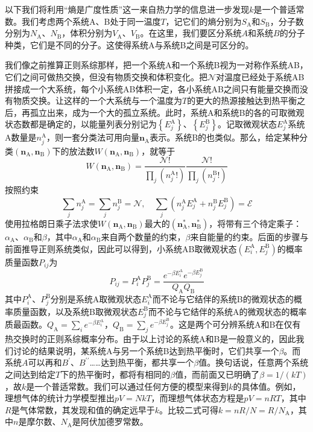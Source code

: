 \documentclass[main.tex]{subfiles}
\begin{document}
以下我们将利用“熵是广度性质”这一来自热力学的信息进一步发现$k$是一个普适常数。我们考虑两个系统A、B处于同一温度$T$，记它们的熵分别为$S_\text{A}$和$S_\text{B}$，分子数分别为$N_\text{A}$、$N_\text{B}$，体积分别为$V_\text{A}$、$V_\text{B}$。在这里，我们要区分系统$A$和系统$B$的分子种类，它们是不同的分子。这使得系统A与系统B之间是可区分的。

我们像之前推算正则系综那样，把一个系统A和一个系统B视为一对称作系统AB，它们之间可做热交换，但没有物质交换和体积变化。把$\mathcal{N}$对温度已经处于系统AB拼接成一个大系统，每个小系统AB体积一定，各小系统AB之间只有能量交换而没有物质交换。让这样的一个大系统与一个温度为$T$的更大的热源接触达到热平衡之后，再孤立出来，成为一个大的孤立系统。此时，系统A和系统B的各的可取微观状态数都是确定的，以能量列表分别记为$\left\{E_j^\text{A}\right\}$、$\left\{E_j^\text{B}\right\}$。记取微观状态$E_j^\text{A}$系统A数量是$n_j^\text{A}$，则一套分类法可用向量$\mathbf{n}_\text{A}$表示。系统B的也类似。那么，给定某种分类$\left(\mathbf{n}_\text{A},\mathbf{n}_\text{B}\right)$下的放法数$W\left(\mathbf{n}_\text{A},\mathbf{n}_\text{B}\right)$，就等于
\[W\left(\mathbf{n}_\text{A},\mathbf{n}_\text{B}\right)=\frac{\mathcal{N}!}{\prod_j\left(n_j^\text{A}!\right)}\frac{\mathcal{N}!}{\prod_j\left(n_j^\text{B}!\right)}\]
按照约束
\[\sum_jn_j^\text{A}=\sum_jn_j^\text{B}=\mathcal{N},\quad\sum_j\left(n_j^\text{A}E_j^\text{A}+n_j^\text{B}E_j^\text{B}\right)=\mathcal{E}\]
使用拉格朗日乘子法求使$W\left(\mathbf{n}_\text{A},\mathbf{n}_\text{B}\right)$最大的$\left(\mathbf{n}_\text{A}^*,\mathbf{n}_\text{B}^*\right)$，将带有三个待定乘子：$\alpha_\text{A}$、$\alpha_\text{B}$和$\beta$，其中$\alpha_\text{A}$和$\alpha_\text{B}$来自两个数量的约束，$\beta$来自能量的约束。后面的步骤与前面推导正则系统类似，因此可以得到，小系统AB取微观状态$\left(E_i^\text{A},E_j^\text{B}\right)$的概率质量函数$P_{ij}$为
\[P_{ij}=P_i^\text{A}P_j^\text{B}=\frac{e^{-\beta E_i^\text{A}}e^{-\beta E_j^\text{B}}}{Q_\text{A}Q_\text{B}}\]
其中$P_i^\text{A}$、$P_j^\text{B}$分别是系统A取微观状态$E_i^\text{A}$而不论与它结伴的系统B的微观状态的概率质量函数，以及系统B取微观状态$E_j^\text{B}$而不论与它结伴的系统A的微观状态的概率质最函数。$Q_\text{A}=\sum_i e^{-\beta E_i^\text{A}}$，$Q_\text{B}=\sum_j e^{-\beta E_j^\text{B}}$。这是两个可分辨系统A和B在仅有热交换时的正则系综概率分布。由于以上讨论的系统A和B是一般意义的，因此我们讨论的结果说明，某系统A与另一个系统B达到热平衡时，它们共享一个$\beta$。而系统$A$可以再和$B^\prime$、$B^{\prime\prime}$……达到热平衡，都共享一个$\beta$值。换句话说，任意两个系统之间达到给定$T$下的热平衡时，都将有相同的$\beta$值，而前面又已明确了$\beta=1/\left(kT\right)$，故$k$是一个普适常数。我们可以通过任何方便的模型来得到$k$的具体值。例如，理想气体的统计力学模型推出$pV=NkT$，而理想气体状态方程是$pV=nRT$，其中$R$是气体常数，其发现和值的确定远早于$k$。比较二式可得$k=nR/N=R/N_\text{A}$，其中$n$是摩尔数、$N_\text{A}$是阿伏加德罗常数。
\end{document}
